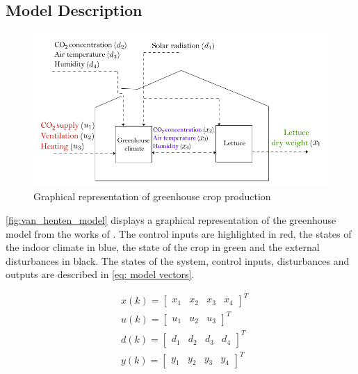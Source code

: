 \subsection{Model Description}
\begin{figure}[H]
	\centering
	\includegraphics[width = 0.75\linewidth]{figures/van_henten_model.png}
	\caption{Graphical representation of greenhouse crop production \cite{hentenGreenhouseClimateManagement1994}}
	\label{fig:van_henten_model}
\end{figure}

\autoref{fig:van_henten_model} displays a graphical representation of the greenhouse model from the works of \citet{hentenGreenhouseClimateManagement1994}. The control inputs are highlighted in red, the states of the indoor climate in blue, the state of the crop in green and the external disturbances in black. The states of the system, control inputs, disturbances and outputs are described in \autoref{eq: model vectors}.

\begin{equation}
	\begin{aligned}
		& x(k) = \begin{bmatrix}
			x_1 & x_{2} & x_3 & x_4
		\end{bmatrix}^T
		\\
		& u(k) = \begin{bmatrix}
			u_{1} & u_{2} & u_3
		\end{bmatrix}^T
		\\
		& d(k) = \begin{bmatrix}
			d_{1} & d_{2} & d_3& d_4
		\end{bmatrix}^T
		\\
		& y(k) = \begin{bmatrix}
			y_1 & y_{2} & y_3 & y_{4}
		\end{bmatrix}^T
	\end{aligned}
	\label{eq: model vectors}
\end{equation}

